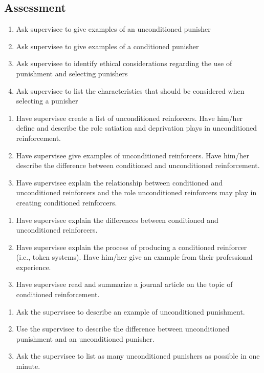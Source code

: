 \subsection{Assessment}
\begin{enumerate}
\item Ask supervisee to give examples of an unconditioned punisher
\item Ask supervisee to give examples of a conditioned  punisher
\item Ask supervisee to identify ethical considerations regarding the use of punishment and selecting punishers 
\item Ask supervisee to list the characteristics that should be considered when selecting a punisher 
\end{enumerate}
%
\begin{enumerate}
\item Have supervisee create a list of unconditioned reinforcers. Have him/her define and describe the role satiation and deprivation plays in unconditioned reinforcement. 
\item Have supervisee give examples of unconditioned reinforcers. Have him/her describe the difference between conditioned and unconditioned reinforcement.
\item Have supervisee explain the relationship between conditioned and unconditioned reinforcers and the role unconditioned reinforcers may play in creating conditioned reinforcers.
\end{enumerate}
%
\begin{enumerate}
\item Have supervisee explain the differences between conditioned and unconditioned reinforcers.
\item Have supervisee explain the process of producing a conditioned reinforcer (i.e., token systems). Have him/her give an example from their professional experience.
\item Have supervisee read and summarize a journal article on the topic of conditioned reinforcement. 
\end{enumerate}
\begin{enumerate}
\item Ask the supervisee to describe an example of unconditioned punishment.
\item Use the supervisee to describe the difference between unconditioned punishment and an unconditioned punisher.
\item Ask the supervisee to list as many unconditioned punishers as possible in one minute.
%
\end{enumerate}
